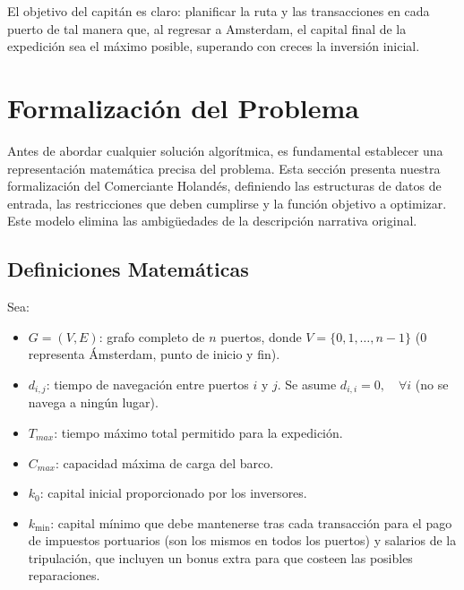 \documentclass[12pt, a4paper]{article}
\begin{document}
El objetivo del capitán es claro: planificar la ruta y las transacciones en cada puerto de tal manera que, al regresar a Amsterdam, el capital final de la expedición sea el máximo posible, superando con creces la inversión inicial.


\section{Formalización del Problema}
Antes de abordar cualquier solución algorítmica, es fundamental establecer una representación matemática precisa del problema. Esta sección presenta nuestra formalización del Comerciante Holandés, definiendo las estructuras de datos de entrada, las restricciones que deben cumplirse y la función objetivo a optimizar. Este modelo elimina las ambigüedades de la descripción narrativa original.
\subsection{Definiciones Matemáticas}

Sea:
\begin{itemize}
    \item $G = (V, E)$: grafo completo de $n$ puertos, donde $V = \{0, 1, \dots, n-1\}$ (0 representa Ámsterdam, punto de inicio y fin).
    \item $d_{i,j}$: tiempo de navegación entre puertos $i$ y $j$. Se asume $d_{i,i} = 0, \quad \forall i$ (no se navega a ningún lugar).
    \item $T_{max}$: tiempo máximo total permitido para la expedición.
    \item $C_{max}$: capacidad máxima de carga del barco.
    \item $k_0$: capital inicial proporcionado por los inversores.
    \item $k_{\min}$: capital mínimo que debe mantenerse tras cada transacción para el pago de impuestos portuarios (son los mismos en todos los puertos) y salarios de la tripulación, que incluyen un bonus extra para que costeen las posibles reparaciones.
\end{itemize}
\end{document}
